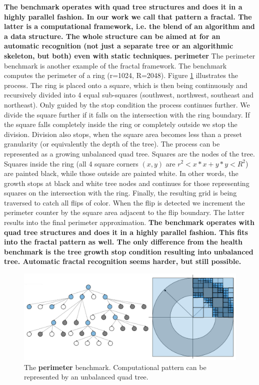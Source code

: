 \quad \textbf{The benchmark operates with quad tree structures and does it in a highly parallel fashion. In our work we call that pattern a fractal. The latter is a computational framework, i.e. the blend of an algorithm and a data structure. The whole structure can be aimed at for an automatic recognition (not just a separate tree or an algorithmic skeleton, but both) even with static techniques.}\newline\null
\quad \textbf{perimeter} \quad The perimeter benchmark is another example of the fractal framework. The benchmark computes the perimeter of a ring (r=1024, R=2048). Figure \ref{fig:perimeter_benchmark} illustrates the process. The ring is placed onto a square, which is then being continuously and recursively divided into 4 equal sub-squares (southwest, northwest, southeast and northeast). Only guided by the stop condition the process continues further. We divide the square further if it falls on the intersection with the ring boundary. If the square falls completely inside the ring or completely outside we stop the division. Division also stops, when the square area becomes less than a preset granularity (or equivalently the depth of the tree). The process can be represented as a growing unbalanced quad tree. Squares are the nodes of the tree. Squares inside the ring (all 4 square corners $(x,y)$ are $r^{2} < x*x + y*y < R^{2}$) are painted black, while those outside are painted white. In other words, the growth stops at black and white tree nodes and continues for those representing squares on the intersection with the ring. Finally, the resulting grid is being traversed to catch all flips of color. When the flip is detected we increment the perimeter counter by the square area adjacent to the flip boundary. The latter results into the final perimeter approximation.\newline\null
\quad \textbf{The benchmark operates with quad tree structures and does it in a highly parallel fashion. This fits into the fractal pattern as well. The only difference from the health benchmark is the tree growth stop condition resulting into unbalanced tree. Automatic fractal recognition seems harder, but still possible.}
\begin{figure}[ht]
\begin{center}
\includegraphics[width=1.0\textwidth]{images/perimeter_benchmark.png}
\caption{The \textbf{perimeter} benchmark. Computational pattern can be represented by an unbalanced quad tree.}
\label{fig:perimeter_benchmark}
\end{center}
\end{figure}\newline\null

